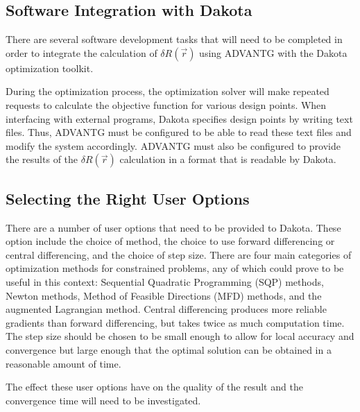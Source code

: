 \subsection{Software Integration with Dakota}
\label{sec:proposal:software_integration_with_dakota}

There are several software development tasks that will need to be completed in order to integrate the calculation of $\delta R\left(\vec{r}\right)$ using ADVANTG with the Dakota optimization toolkit.

During the optimization process, the optimization solver will make repeated requests to calculate the objective function for various design points.
When interfacing with external programs, Dakota specifies design points by writing text files.
Thus, ADVANTG must be configured to be able to read these text files and modify the system accordingly.
ADVANTG must also be configured to provide the results of the $\delta R\left(\vec{r}\right)$ calculation in a format that is readable by Dakota.

\subsection{Selecting the Right User Options}
\label{sec:proposal:selecting_the_right_user_options}

There are a number of user options that need to be provided to Dakota.
These option include the choice of method, the choice to use forward differencing or central differencing, and the choice of step size.
There are four main categories of optimization methods for constrained problems, any of which could prove to be useful in this context: Sequential Quadratic Programming (SQP) methods, Newton methods, Method of Feasible Directions (MFD) methods, and the augmented Lagrangian method.
Central differencing produces more reliable gradients than forward differencing, but takes twice as much computation time.
The step size should be chosen to be small enough to allow for local accuracy and convergence but large enough that the optimal solution can be obtained in a reasonable amount of time.

The effect these user options have on the quality of the result and the convergence time will need to be investigated.

